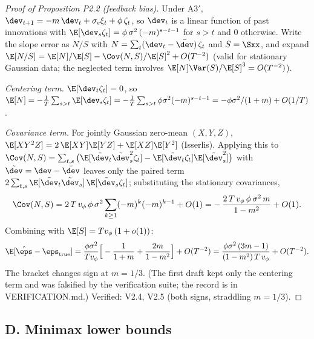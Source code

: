 \begin{proof}[Proof of Proposition P2.2 (feedback bias)]
Under A3$'$, $\dev_{t+1} = -m\,\dev_t + \sigma_e \xi_t + \phi\,\zeta_t$, so
$\dev_t$ is a linear function of past innovations with
$\E[\dev_s \zeta_t] = \phi\,\sigma^2\,(-m)^{s-t-1}$ for $s > t$ and $0$
otherwise. Write the slope error as $N/S$ with
$N = \sum_t (\dev_t - \bar\dev)\,\zeta_t$ and $S = \Sxx$, and expand
$\E[N/S] = \E[N]/\E[S] - \Cov(N, S)/\E[S]^2 + O(T^{-2})$ (valid for
stationary Gaussian data; the neglected term involves
$\E[N]\Var(S)/\E[S]^3 = O(T^{-2})$).

\emph{Centering term.} $\E[\dev_t \zeta_t] = 0$, so
$\E[N] = -\tfrac{1}{T}\sum_{s>t}\E[\dev_s\zeta_t]
= -\tfrac{1}{T}\sum_{s>t}\phi\sigma^2(-m)^{s-t-1}
= -\phi\sigma^2/(1+m) + O(1/T)$.

\emph{Covariance term.} For jointly Gaussian zero-mean $(X, Y, Z)$,
$\E[XY^2Z] = 2\,\E[XY]\E[YZ] + \E[XZ]\E[Y^2]$ (Isserlis). Applying this to
$\Cov(N, S) = \sum_{t,s}\big(\E[\tilde\dev_t \tilde\dev_s^2 \zeta_t] -
\E[\tilde\dev_t\zeta_t]\E[\tilde\dev_s^2]\big)$ with
$\tilde\dev = \dev - \bar\dev$ leaves only the paired term
$2\sum_{t,s}\E[\tilde\dev_t\tilde\dev_s]\,\E[\tilde\dev_s\zeta_t]$;
substituting the stationary covariances,
\[
\Cov(N,S) = 2\,T\,v_\phi\,\phi\,\sigma^2 \sum_{k \ge 1} (-m)^{k}(-m)^{k-1}
 + O(1)
 = -\,\frac{2\,T\,v_\phi\,\phi\,\sigma^2\,m}{1-m^2} + O(1).
\]
Combining with $\E[S] = T v_\phi\,(1+o(1))$:
\[
\E[\hat\eps - \eps_{\mathrm{true}}]
 = \frac{\phi\sigma^2}{T v_\phi}\Big[-\frac{1}{1+m} + \frac{2m}{1-m^2}\Big]
 + O(T^{-2})
 = \frac{\phi\sigma^2\,(3m-1)}{(1-m^2)\,T\,v_\phi} + O(T^{-2}).
\]
The bracket changes sign at $m = 1/3$. (The first draft kept only the
centering term and was falsified by the verification suite; the record is
in VERIFICATION.md.) Verified: V2.4, V2.5 (both signs, straddling
$m = 1/3$).
\end{proof}

\subsection*{D. Minimax lower bounds}

